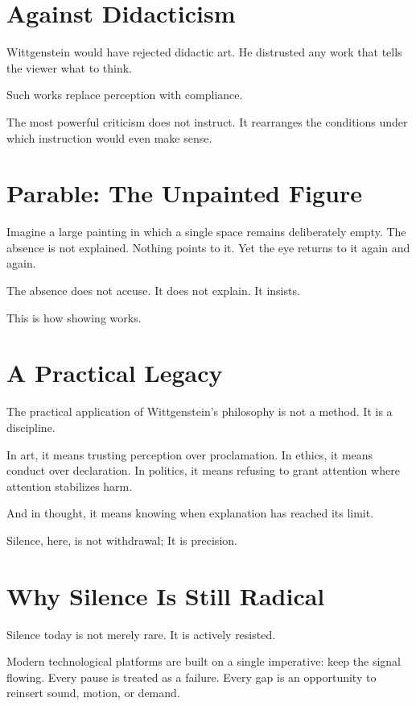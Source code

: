 \documentclass[11pt]{article}
\begin{document}
\section*{Against Didacticism}

Wittgenstein would have rejected didactic art. He distrusted any work that tells the viewer what to think.

Such works replace perception with compliance.

The most powerful criticism does not instruct. It rearranges the conditions under which instruction would even make sense.

\section*{Parable: The Unpainted Figure}

Imagine a large painting in which a single space remains deliberately empty. The absence is not explained. Nothing points to it. Yet the eye returns to it again and again.

The absence does not accuse.  
It does not explain.  
It insists.

This is how showing works.

\section*{A Practical Legacy}

The practical application of Wittgenstein’s philosophy is not a method. It is a discipline.

In art, it means trusting perception over proclamation.  
In ethics, it means conduct over declaration.  
In politics, it means refusing to grant attention where attention stabilizes harm.

And in thought, it means knowing when explanation has reached its limit.

Silence, here, is not withdrawal; It is precision.

\section*{Why Silence Is Still Radical}

Silence today is not merely rare. It is actively resisted.

Modern technological platforms are built on a single imperative: keep the signal flowing. Every pause is treated as a failure. Every gap is an opportunity to reinsert sound, motion, or demand.
\end{document}
